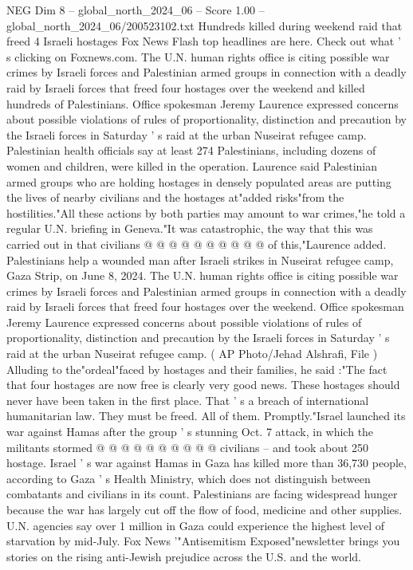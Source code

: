 \begin{textsample}{NEG Dim 8 – global\_north\_2024\_06 – Score 1.00 – global\_north\_2024\_06/200523102.txt}  \label{ex:f8_neg_397}
Hundreds killed during weekend raid that freed 4 Israeli hostages Fox News Flash top headlines are here.
Check out what ' s clicking on Foxnews.com.
The U.N. human rights office is citing possible war crimes by Israeli forces and Palestinian armed groups in connection with a deadly raid by Israeli forces that freed four hostages over the weekend and killed hundreds of Palestinians.
Office spokesman Jeremy Laurence expressed concerns about possible violations of rules of proportionality, distinction and precaution by the Israeli forces in Saturday ' s raid at the urban Nuseirat refugee camp.
Palestinian health officials say at least 274 Palestinians, including dozens of women and children, were killed in the operation.
Laurence said Palestinian armed groups who are holding hostages in densely populated areas are putting the lives of nearby civilians and the hostages at"added risks"from the hostilities."All these actions by both parties may amount to war crimes,"he told a regular U.N. briefing in Geneva."It was catastrophic, the way that this was carried out in that civilians @ @ @ @ @ @ @ @ @ @ of this,"Laurence added.
Palestinians help a wounded man after Israeli strikes in Nuseirat refugee camp, Gaza Strip, on June 8, 2024.
The U.N. human rights office is citing possible war crimes by Israeli forces and Palestinian armed groups in connection with a deadly raid by Israeli forces that freed four hostages over the weekend.
Office spokesman Jeremy Laurence expressed concerns about possible violations of rules of proportionality, distinction and precaution by the Israeli forces in Saturday ' s raid at the urban Nuseirat refugee camp. ( AP Photo/Jehad Alshrafi, File ) Alluding to the"ordeal"faced by hostages and their families, he said :"The fact that four hostages are now free is clearly very good news.
These hostages should never have been taken in the first place.
That ' s a breach of international humanitarian law.
They must be freed.
All of them.
Promptly."Israel launched its war against Hamas after the group ' s stunning Oct. 7 attack, in which the militants stormed @ @ @ @ @ @ @ @ @ @ civilians -- and took about 250 hostage.
Israel ' s war against Hamas in Gaza has killed more than 36,730 people, according to Gaza ' s Health Ministry, which does not distinguish between combatants and civilians in its count.
Palestinians are facing widespread hunger because the war has largely cut off the flow of food, medicine and other supplies.
U.N. agencies say over 1 million in Gaza could experience the highest level of starvation by mid-July.
Fox News '"Antisemitism Exposed"newsletter brings you stories on the rising anti-Jewish prejudice across the U.S. and the world.

\end{textsample}
